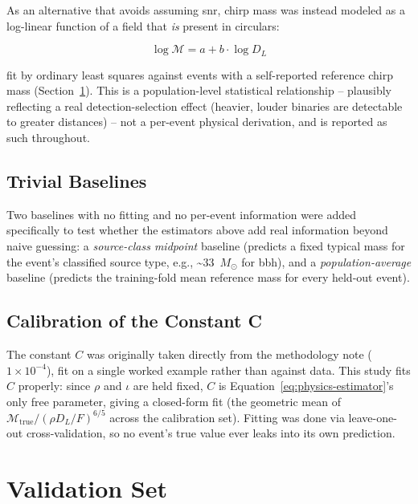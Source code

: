 As an alternative that avoids assuming \gls{snr}, chirp mass was instead modeled as a log-linear function of a field that \emph{is} present in circulars:

\begin{equation}
    \log \mathcal{M} = a + b \cdot \log D_L
    \label{eq:statistical-estimator}
\end{equation}

fit by ordinary least squares against events with a self-reported reference chirp mass (Section~\ref{sec:validation-set}). This is a population-level statistical relationship -- plausibly reflecting a real detection-selection effect (heavier, louder binaries are detectable to greater distances) -- not a per-event physical derivation, and is reported as such throughout.

\subsection{Trivial Baselines}

Two baselines with no fitting and no per-event information were added specifically to test whether the estimators above add real information beyond naive guessing: a \emph{source-class midpoint} baseline (predicts a fixed typical mass for the event's classified source type, e.g., \textasciitilde33~$M_\odot$ for \gls{bbh}), and a \emph{population-average} baseline (predicts the training-fold mean reference mass for every held-out event).

\subsection{Calibration of the Constant C}
\label{sec:calibration}

The constant $C$ was originally taken directly from the methodology note ($1\times10^{-4}$), fit on a single worked example rather than against data. This study fits $C$ properly: since $\rho$ and $\iota$ are held fixed, $C$ is Equation~\ref{eq:physics-estimator}'s only free parameter, giving a closed-form fit (the geometric mean of $\mathcal{M}_{\text{true}} / (\rho D_L / F)^{6/5}$ across the calibration set). Fitting was done via leave-one-out cross-validation, so no event's true value ever leaks into its own prediction.

\section{Validation Set}
\label{sec:validation-set}

